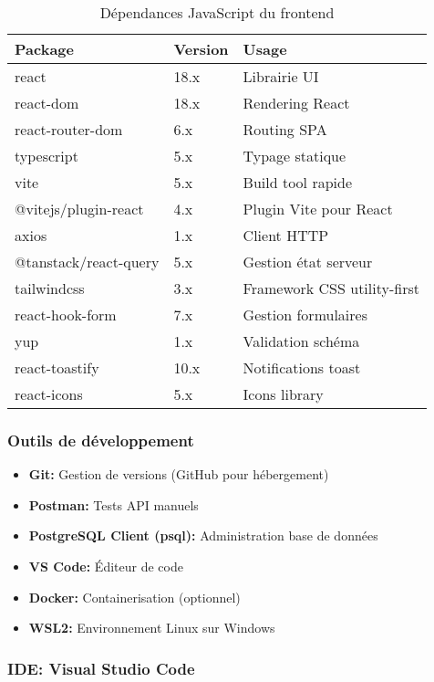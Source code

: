\begin{table}[H]
\centering
\small
\begin{tabular}{|l|l|p{6cm}|}
\hline
\textbf{Package} & \textbf{Version} & \textbf{Usage} \\
\hline
react & 18.x & Librairie UI \\
react-dom & 18.x & Rendering React \\
react-router-dom & 6.x & Routing SPA \\
typescript & 5.x & Typage statique \\
\hline
vite & 5.x & Build tool rapide \\
@vitejs/plugin-react & 4.x & Plugin Vite pour React \\
\hline
axios & 1.x & Client HTTP \\
@tanstack/react-query & 5.x & Gestion état serveur \\
\hline
tailwindcss & 3.x & Framework CSS utility-first \\
\hline
react-hook-form & 7.x & Gestion formulaires \\
yup & 1.x & Validation schéma \\
\hline
react-toastify & 10.x & Notifications toast \\
react-icons & 5.x & Icons library \\
\hline
\end{tabular}
\caption{Dépendances JavaScript du frontend}
\end{table}

\subsubsection{Outils de développement}

\begin{itemize}
    \item \textbf{Git:} Gestion de versions (GitHub pour hébergement)
    \item \textbf{Postman:} Tests API manuels
    \item \textbf{PostgreSQL Client (psql):} Administration base de données
    \item \textbf{VS Code:} Éditeur de code
    \item \textbf{Docker:} Containerisation (optionnel)
    \item \textbf{WSL2:} Environnement Linux sur Windows
\end{itemize}

\subsubsection{IDE: Visual Studio Code}

